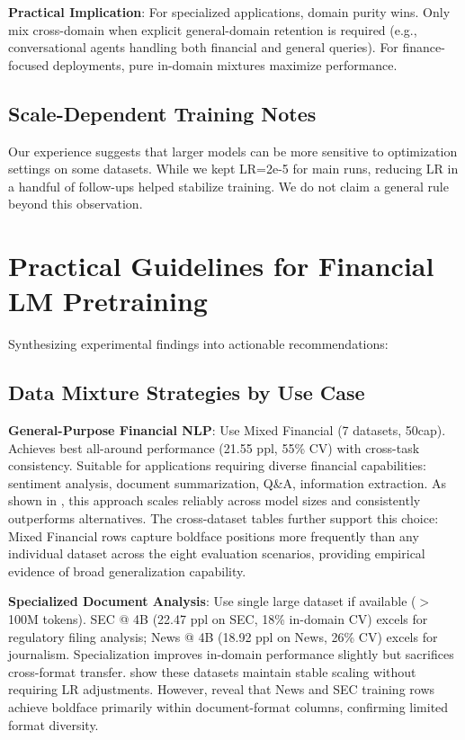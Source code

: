 \textbf{Practical Implication}: For specialized applications, domain purity wins. Only mix cross-domain when explicit general-domain retention is required (e.g., conversational agents handling both financial and general queries). For finance-focused deployments, pure in-domain mixtures maximize performance.

\subsection{Scale-Dependent Training Notes}

Our experience suggests that larger models can be more sensitive to optimization settings on some datasets. While we kept LR=2e-5 for main runs, reducing LR in a handful of follow-ups helped stabilize training. We do not claim a general rule beyond this observation.

\section{Practical Guidelines for Financial LM Pretraining}

Synthesizing experimental findings into actionable recommendations:

\subsection{Data Mixture Strategies by Use Case}

\textbf{General-Purpose Financial NLP}: Use Mixed Financial (7 datasets, 50cap). Achieves best all-around performance (21.55 ppl, 55\% CV) with cross-task consistency. Suitable for applications requiring diverse financial capabilities: sentiment analysis, document summarization, Q\&A, information extraction. As shown in , this approach scales reliably across model sizes and consistently outperforms alternatives. The cross-dataset tables further support this choice: Mixed Financial rows capture boldface positions more frequently than any individual dataset across the eight evaluation scenarios, providing empirical evidence of broad generalization capability.

\textbf{Specialized Document Analysis}: Use single large dataset if available ($>$ 100M tokens). SEC @ 4B (22.47 ppl on SEC, 18\% in-domain CV) excels for regulatory filing analysis; News @ 4B (18.92 ppl on News, 26\% CV) excels for journalism. Specialization improves in-domain performance slightly but sacrifices cross-format transfer.  show these datasets maintain stable scaling without requiring LR adjustments. However,  reveal that News and SEC training rows achieve boldface primarily within document-format columns, confirming limited format diversity.

